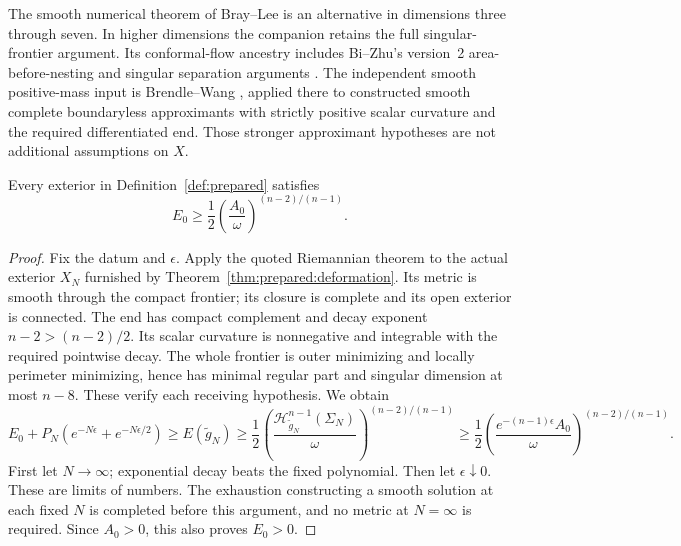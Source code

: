 The smooth numerical theorem of Bray--Lee
\cite[Theorem~1.4]{BrayLee2009} is an alternative in dimensions three
through seven. In higher dimensions the companion retains the full
singular-frontier argument. Its conformal-flow ancestry includes Bi--Zhu's
version~2 area-before-nesting and singular separation arguments
\cite{BiZhu2026v2}. The independent smooth positive-mass input is
Brendle--Wang \cite[Corollary~1.6]{BrendleWang2026}, applied there to
constructed smooth complete boundaryless approximants with strictly
positive scalar curvature and the required differentiated end. Those
stronger approximant hypotheses are not additional assumptions on $X$.

\begin{theorem}
\label{thm:numerical:prepared}
Every exterior in Definition~\ref{def:prepared} satisfies
\begin{equation}\label{eq:height:prepared-inequality}
 E_0\ge\frac12\left(\frac{A_0}{\omega}\right)^{(n-2)/(n-1)}.
\end{equation}
\end{theorem}
\begin{proof}
Fix the datum and $\epsilon$. Apply the quoted Riemannian theorem to
the actual exterior $X_N$ furnished by
Theorem~\ref{thm:prepared:deformation}. Its metric is smooth through the
compact frontier; its closure is complete and its open exterior is
connected. The end has compact complement and decay exponent
$n-2>(n-2)/2$. Its scalar curvature is nonnegative and integrable with
the required pointwise decay. The whole frontier is outer minimizing
and locally perimeter minimizing, hence has minimal regular part and
singular dimension at most $n-8$. These verify each receiving hypothesis.
We obtain
\[
 E_0+P_N(e^{-N\epsilon}+e^{-N\epsilon/2})
 \ge E(\widetilde g_N)
 \ge\frac12\left(
 \frac{\mathcal H^{n-1}_{\widetilde g_N}(\Sigma_N)}\omega
 \right)^{(n-2)/(n-1)}
 \ge\frac12\left(\frac{e^{-(n-1)\epsilon}A_0}\omega
 \right)^{(n-2)/(n-1)}.
\]
First let $N\to\infty$; exponential decay beats the fixed polynomial.
Then let $\epsilon\downarrow0$. These are limits of numbers. The
exhaustion constructing a smooth solution at each fixed $N$ is completed
before this argument, and no metric at $N=\infty$ is required.
Since $A_0>0$, this also proves $E_0>0$.
\end{proof}

